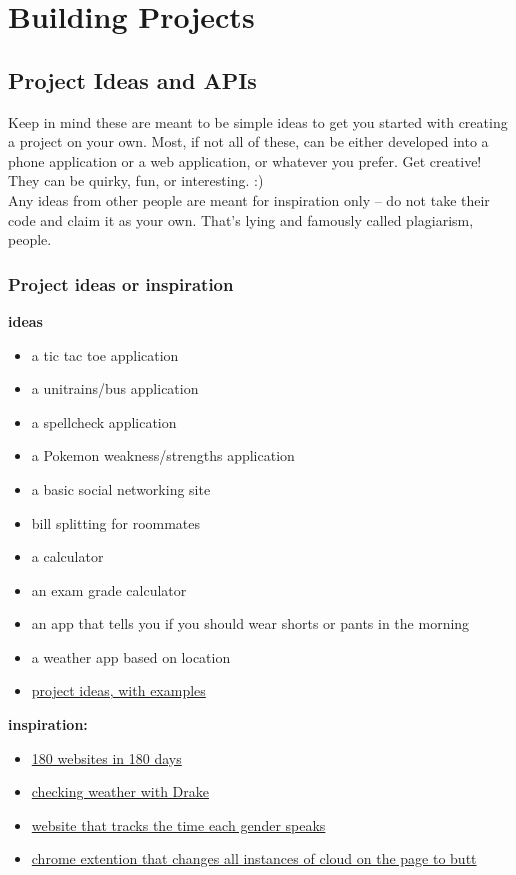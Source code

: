 \documentclass{article}
\begin{document}
\section{Building Projects}
\subsection {Project Ideas and APIs}
\label{sec:projects}
\hspace{0.5cm} Keep in mind these are meant to be simple ideas to get you started with creating a project on your own. Most, if not all of these, can be either developed into a phone application or a web application, or whatever you prefer. Get creative! They can be quirky, fun, or interesting. :) \\

Any ideas from other people are meant for inspiration only -- do not take their code and claim it as your own. That's lying and famously called plagiarism, people. 
\subsubsection{Project ideas or inspiration}
\textbf{ideas}
\begin{itemize}
    \item a tic tac toe application
    \item a unitrains/bus application
    \item a spellcheck application
    \item a Pokemon weakness/strengths application
    \item a basic social networking site
    \item bill splitting for roommates
    \item a calculator
    \item an exam grade calculator 
    \item an app that tells you if you should wear shorts or pants in the morning
    \item a weather app based on location
    \item \href{https://github.com/karan/Projects}{project ideas, with examples}
\end{itemize}
\textbf{inspiration:}
\begin{itemize}
    \item \href{https://jenniferdewalt.com/}{180 websites in 180 days}
    \item \href{http://drakeweather.com/}{checking weather with Drake}
    \item \href{https://github.com/cathydeng/are-men-talking-too-much}{website that tracks the time each gender speaks}
    \item \href{https://github.com/panicsteve/cloud-to-butt}{chrome extention that changes all instances of cloud on the page to butt}
\end{itemize}
\end{document}
